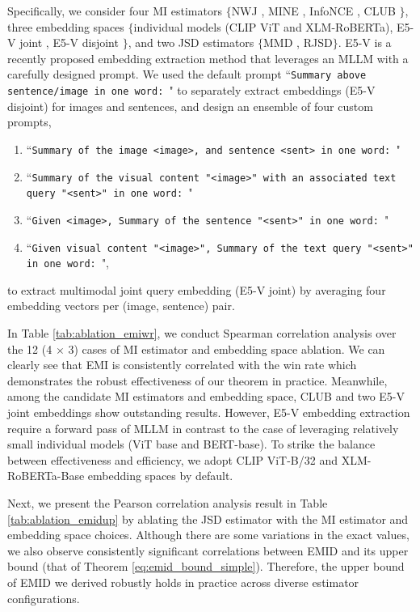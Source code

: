 Specifically, we consider four MI estimators $\{$NWJ \cite{nguyen2010estimating}, MINE \cite{mine2018}, InfoNCE \cite{oord2018representation}, CLUB \cite{cheng2020club}$\}$, three embedding spaces $\{$individual models (CLIP ViT and XLM-RoBERTa), E5-V joint \cite{jiang2024e5}, E5-V disjoint \cite{jiang2024e5}$\}$, and two JSD estimators $\{$MMD \cite{liu2020learning}, RJSD\cite{hoyos2023representation}$\}$. E5-V \cite{jiang2024e5} is a recently proposed embedding extraction method that leverages an MLLM with a carefully designed prompt. We used the default prompt ``\texttt{Summary above sentence/image in one word: }" to separately extract embeddings (E5-V disjoint) for images and sentences, and design an ensemble of four custom prompts, 
\begin{enumerate}
    \item ``\texttt{Summary of the image <image>, and sentence <sent> in one word: }"
    \item ``\texttt{Summary of the visual content "<image>" with an associated text query "<sent>" in one word: }"
    \item ``\texttt{Given <image>, Summary of the sentence "<sent>" in one word: }"
    \item ``\texttt{Given visual content "<image>", Summary of the text query "<sent>" in one word: }",
\end{enumerate}
to extract multimodal joint query embedding (E5-V joint) by averaging four embedding vectors per (image, sentence) pair.


In Table \ref{tab:ablation_emiwr}, we conduct Spearman correlation analysis over the 12 (4 $\times$ 3) cases of MI estimator and embedding space ablation. We can clearly see that EMI is consistently correlated with the win rate which demonstrates the robust effectiveness of our theorem in practice. Meanwhile, among the candidate MI estimators and embedding space, CLUB and two E5-V joint embeddings show outstanding results. However, E5-V embedding extraction require a forward pass of MLLM in contrast to the case of leveraging relatively small individual models (ViT base and BERT-base). To strike the balance between effectiveness and efficiency, we adopt CLIP ViT-B/32 and XLM-RoBERTa-Base embedding spaces by default.


Next, we present the Pearson correlation analysis result in Table \ref{tab:ablation_emidup} by ablating the JSD estimator with the MI estimator and embedding space choices. Although there are some variations in the exact values, we also observe consistently significant correlations between EMID and its upper bound (that of Theorem \ref{eq:emid_bound_simple}). Therefore, the upper bound of EMID we derived robustly holds in practice across diverse estimator configurations.

